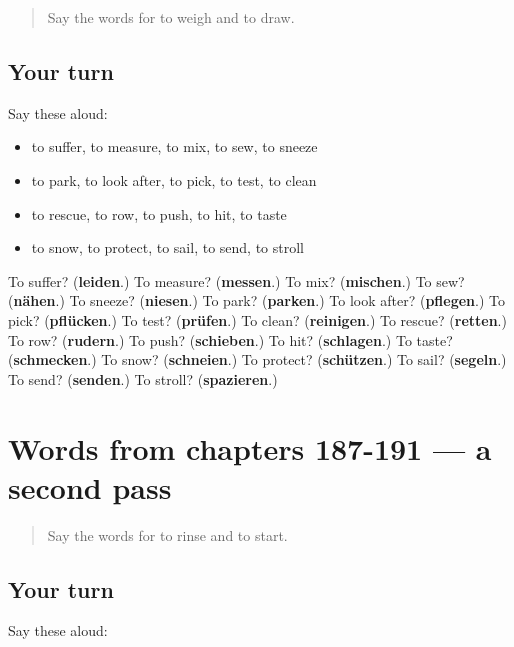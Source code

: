 \label{lesson:GE-R191-first-pass-words-from-chapters-183-186}



\begin{quote}
Say the words for to weigh and to draw.
\end{quote}

\subsection*{Your turn}
Say these aloud:

\begin{itemize}
\raggedright
  \item to suffer, to measure, to mix, to sew, to sneeze
  \item to park, to look after, to pick, to test, to clean
  \item to rescue, to row, to push, to hit, to taste
  \item to snow, to protect, to sail, to send, to stroll
\end{itemize}

\begin{tcolorbox}[breakable,colback=teal!4,colframe=teal!35!black,title={Before you move on}]
To suffer? (\textbf{leiden}.) To measure? (\textbf{messen}.) To mix? (\textbf{mischen}.) To sew? (\textbf{nähen}.) To sneeze? (\textbf{niesen}.) To park? (\textbf{parken}.) To look after? (\textbf{pflegen}.) To pick? (\textbf{pflücken}.) To test? (\textbf{prüfen}.) To clean? (\textbf{reinigen}.) To rescue? (\textbf{retten}.) To row? (\textbf{rudern}.) To push? (\textbf{schieben}.) To hit? (\textbf{schlagen}.) To taste? (\textbf{schmecken}.) To snow? (\textbf{schneien}.) To protect? (\textbf{schützen}.) To sail? (\textbf{segeln}.) To send? (\textbf{senden}.) To stroll? (\textbf{spazieren}.)
\end{tcolorbox}
\section[(dialogue)]{Words from chapters 187-191 — a second pass}

\label{lesson:GE-R191-second-pass-words-from-chapters-187-191}



\begin{quote}
Say the words for to rinse and to start.
\end{quote}

\subsection*{Your turn}
Say these aloud:

